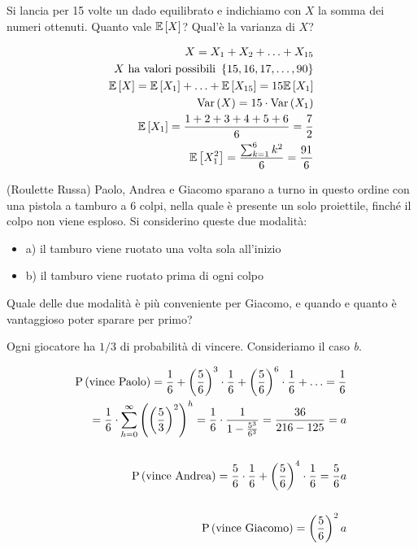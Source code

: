 \begin{exrc}
    Si lancia per 15 volte un dado equilibrato e indichiamo con $ X $ la somma dei numeri ottenuti. Quanto vale \(\mathbb{E}\left[X\right]\)? Qual'è la varianza di \(X\)?

    \begin{equation*}
    \begin{aligned}
        X = X_1 + X_2 + \hdots + X_{15} \\
        X \text{ ha valori possibili } \left\{ 15, 16, 17, \hdots, 90\right\} \\
        \mathbb{E}\left[X\right] = \mathbb{E}\left[X_1\right] + \hdots + \mathbb{E}\left[X_{15}\right] = 15 \mathbb{E}\left[X_1\right] \\
        \text{Var}\left(X\right) = 15 \cdot \text{Var}\left(X_1\right) \\
        \mathbb{E}\left[X_1\right] = \dfrac{1 + 2 + 3 + 4 + 5 + 6}{6} = \dfrac{7}{2} \\
        \mathbb{E}\left[X_1^2\right] = \dfrac{\sum_{k=1}^6 k^2}{6} = \dfrac{91}{6}
    \end{aligned}
    \end{equation*}
\end{exrc}

\begin{exrc} (Roulette Russa)
    Paolo, Andrea e Giacomo sparano a turno in questo ordine con una pistola a tamburo a 6 colpi, nella quale è presente un solo proiettile, finché il colpo non viene esploso. Si considerino queste due modalità:
    \begin{itemize}
        \item a) il tamburo viene ruotato una volta sola all'inizio
        \item b) il tamburo viene ruotato prima di ogni colpo
    \end{itemize}

    Quale delle due modalità è più conveniente per Giacomo, e quando e quanto è vantaggioso poter sparare per primo?

    Ogni giocatore ha \(1/3\) di probabilità di vincere. Consideriamo il caso \textit{b}.

    \begin{equation*}
        \begin{aligned}
            \text{P}\left(\text{vince Paolo}\right) = \frac{1}{6} + \left( \frac{5}{6} \right)^3 \cdot \frac{1}{6} + \left( \frac{5}{6} \right)^6 \cdot \frac{1}{6} + \hdots = \frac{1}{6} \\
            = \frac{1}{6} \cdot \sum_{h=0}^\infty \left( \left( \frac{5}{3} \right)^2 \right)^h = \frac{1}{6} \cdot \frac{1}{1- \frac{5^3}{6^3} } = \frac{36}{216 - 125} = a \\ \\
            \text{P}\left(\text{vince Andrea}\right) = \frac{5}{6} \cdot \frac{1}{6} + \left( \frac{5}{6} \right)^4 \cdot \frac{1}{6} = \frac{5}{6}a \\ \\
            \text{P}\left(\text{vince Giacomo}\right) = \left( \frac{5}{6} \right)^2 a
        \end{aligned}
    \end{equation*}

\end{exrc}


